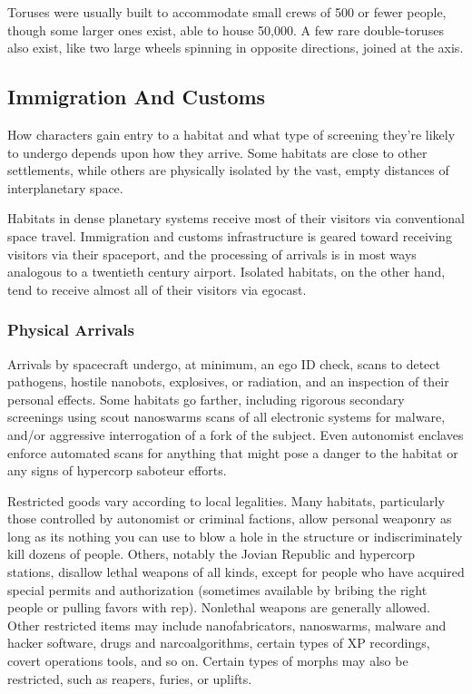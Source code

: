 Toruses were usually built to accommodate small 
crews of 500 or fewer people, though some larger 
ones exist, able to house 50,000. A few rare double-toruses
also exist, like two large wheels spinning in
opposite directions, joined at the axis.

\subsection{Immigration And Customs}

How characters gain entry to a habitat and what type 
of screening they're likely to undergo depends upon 
how they arrive. Some habitats are close to other 
settlements, while others are physically isolated by the 
vast, empty distances of interplanetary space.

Habitats in dense planetary systems receive most of 
their visitors via conventional space travel. Immigration
and customs infrastructure is geared toward receiving
visitors via their spaceport, and the processing
of arrivals is in most ways analogous to a twentieth 
century airport. Isolated habitats, on the other hand, 
tend to receive almost all of their visitors via egocast.

\subsubsection{Physical Arrivals}

Arrivals by spacecraft undergo, at minimum, an ego 
ID check, scans to detect pathogens, hostile nanobots, 
explosives, or radiation, and an inspection of their 
personal effects. Some habitats go farther, including 
rigorous secondary screenings using scout nanoswarms
scans of all electronic systems for malware,
and/or aggressive interrogation of a fork of the subject. 
Even autonomist enclaves enforce automated scans for 
anything that might pose a danger to the habitat or 
any signs of hypercorp saboteur efforts.

Restricted goods vary according to local legalities. 
Many habitats, particularly those controlled by autonomist
or criminal factions, allow personal weaponry
as long as its nothing you can use to blow a hole in 
the structure or indiscriminately kill dozens of people. 
Others, notably the Jovian Republic and hypercorp 
stations, disallow lethal weapons of all kinds, except 
for people who have acquired special permits and authorization
(sometimes available by bribing the right
people or pulling favors with rep). Nonlethal weapons 
are generally allowed. Other restricted items may 
include nanofabricators, nanoswarms, malware and 
hacker software, drugs and narcoalgorithms, certain 
types of XP recordings, covert operations tools, and 
so on. Certain types of morphs may also be restricted, 
such as reapers, furies, or uplifts.

